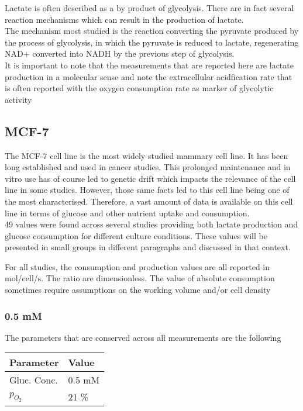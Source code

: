 \documentclass[11pt,a4paper]{article}
\begin{document}
Lactate is often described as a by product of glycolysis. There are in  fact several reaction mechanisms which can result in the production of lactate. \\

The mechanism most studied is the reaction converting the pyruvate produced  by the process of glycolysis, in which the pyruvate is reduced to lactate, regenerating NAD+ converted into NADH by the previous step of glycolysis.\cite{Berg2006}\\

It is important to note that the measurements that are reported here are lactate production in a molecular sense and note the extracellular acidfication rate that is often reported with the oxygen consumption rate as marker of glycolytic activity 


\subsection{MCF-7}
The MCF-7 cell line is the most widely studied mammary cell line. It has been long established and used in cancer studies. This prolonged maintenance and in vitro use has of course led to genetic drift which impacts the relevance of the cell line in some studies. However, those same facts led to this cell line being one of the most characterised. Therefore, a vast amount of data is available on this cell line in terms of glucose and other nutrient uptake and consumption.\\

49 values were found across several studies providing both lactate production  and glucose consumption for different culture conditions. These values will be presented in small groups in different paragraphs  and discussed in that context.

For all studies, the consumption and production values are all reported in mol/cell/s. The ratio are dimensionless. The value of absolute consumption sometimes require assumptions on the working volume and/or cell density

\subsubsection{0.5 mM}
The parameters that are conserved across all measurements are the following 

\begin{table}[h!]
\begin{center}
\begin{tabular}{ |p{25mm}|p{25mm}|}
\hline
\textbf{Parameter} & \textbf{Value} \\
\hline
Gluc. Conc. & 0.5 mM \\
\hline
$p_{O_2}$ & 21 \% \\
\hline
\end{tabular}
\end{center}
\end{table}
\end{document}
